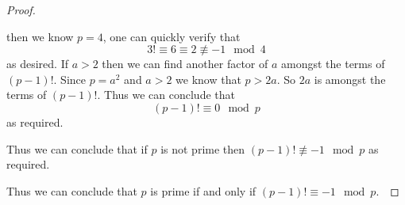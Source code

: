 \begin{proof}
\begin{itemize}
\begin{itemize}
                            then we know $p = 4$, one can quickly verify that
                            \[
                                3! \equiv 6 \equiv 2 \not\equiv -1 \mod 4
                            \]
                            as desired. If $a > 2$ then we can find another factor of $a$ amongst
                            the terms of $(p - 1)!$. Since $p = a^2$ and $a > 2$ we know that $p > 2a$.
                            So $2a$ is amongst the terms of $(p - 1)!$. Thus we can conclude that
                            \[
                                (p - 1)! \equiv 0 \mod p
                            \]
                            as required.
                    \end{itemize}
                    Thus we can conclude that if $p$ is not prime then $(p - 1)! \not\equiv -1 \mod p$
                    as required.
            \end{itemize}
            Thus we can conclude that $p$ is prime if and only if $(p - 1)! \equiv -1 \mod p$.~\QED
        \end{proof}
